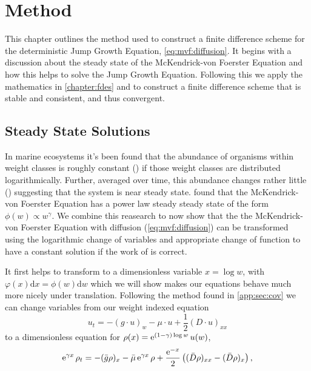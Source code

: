 \documentclass[../main.tex]{subfiles}
\begin{document}
  \chapter{Method}\label{chapter:method}
  This chapter outlines the method used to construct a finite difference scheme for the deterministic Jump Growth Equation, \autoref{eq:mvf:diffusion}. It begins with a discussion about the steady state of the McKendrick-von Foerster Equation and how this helps to solve the Jump Growth Equation. Following this we apply the mathematics in \autoref{chapter:fdes} and \cite{rosinger2008} to construct a finite difference scheme that is stable and consistent, and thus convergent.


  \section{Steady State Solutions}\label{sec:met:steadystate}
  In marine ecosystems it's been found that the abundance of organisms within weight classes is roughly constant (\cite{sheldon1972}) if those weight classes are distributed logarithmically. Further, averaged over time, this abundance changes rather little (\cite{datta2011}) suggesting that the system is near steady state. \cite{benoit2004} found that the McKendrick-von Foerster Equation has a power law steady steady state of the form $\phi(w) \propto w^{\gamma}$. We combine this reasearch to now show that the the McKendrick-von Foerster Equation with diffusion (\autoref{eq:mvf:diffusion}) can be transformed using the logarithmic change of variables and appropriate change of function to have a constant solution if the work of \cite{benoit2004} is correct.

  It first helps to transform to a dimensionless variable $x = \log{w}$, with $\varphi(x) \mathrm{d}x = \phi(w) \mathrm{d}w$ which we will show makes our equations behave much more nicely under translation. Following the method found in \autoref{app:sec:cov} we can change variables from our weight indexed equation
  \begin{equation}
    u_t = -(g \cdot u)_w - \mu \cdot u + \frac{1}{2}(D \cdot u)_{xx}
  \end{equation}
  to a dimensionless equation for $\rho(x) = \operatorname{e}^{(1 - \gamma) \log{w}} u(w)$,
  \begin{equation}
    \operatorname{e}^{\gamma x} \rho_t = - (\bar{g} \rho)_x - \bar{\mu} \operatorname{e}^{\gamma x} \rho + \frac{\operatorname{e}^{-x}}{2} \left( (\bar{D} \rho)_{xx} - (\bar{D} \rho)_x \right),
  \end{equation}
\end{document}
